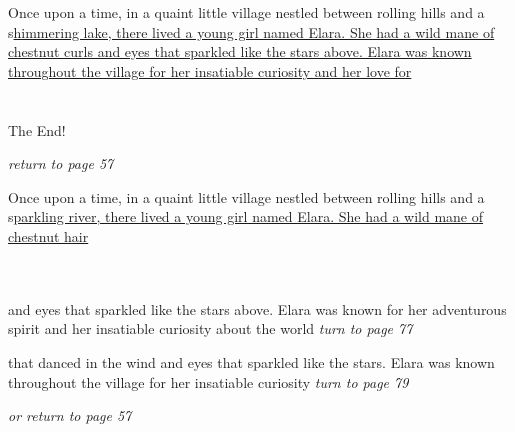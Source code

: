 \documentclass{memoir}
\begin{document}
        


        \hspace{1cm}\vfill
        \begin{minipage}{3in}
        \LARGE
        Once upon a time, in a quaint little village nestled between rolling hills and a s\ul{himmering lake, there lived a young girl named Elara. She had a wild mane of chestnut curls and eyes that sparkled like the stars above. Elara was known throughout the village for her insatiable curiosity and her love for}\\ \vspace{5mm} \\
 \\\vspace{1cm} The End! \\ 

        \hspace{1cm}\begin{minipage}{6cm}
        \normalsize
            \hfill \textit{return to page 57}
        \end{minipage} 
        \end{minipage}
        \hspace{1cm}\vfill
        \cleardoublepage

        


        \hspace{1cm}\vfill
        \begin{minipage}{3in}
        \LARGE
        Once upon a time, in a quaint little village nestled between rolling hills and a s\ul{parkling river, there lived a young girl named Elara. She had a wild mane of chestnut hair}\\ \vspace{5mm} \\
  \\ 

        \hspace{1cm}\begin{minipage}{6cm}
        \normalsize
            and eyes that sparkled like the stars above. Elara was known for her adventurous spirit and her insatiable curiosity about the world \hfill \textit{turn to page 77}\\ \vspace{5mm}

that danced in the wind and eyes that sparkled like the stars. Elara was known throughout the village for her insatiable curiosity \hfill \textit{turn to page 79}\\ \vspace{5mm}

\hfill \textit{or return to page 57}
        \end{minipage} 
        \end{minipage}
        \hspace{1cm}\vfill
        \cleardoublepage
\end{document}
